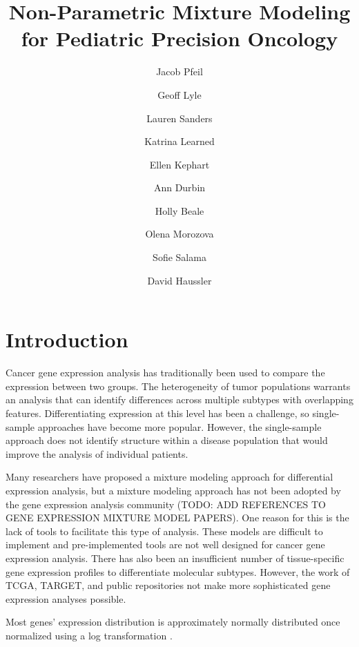 \documentclass[fleqn,10pt]{wlscirep}
\title{Non-Parametric Mixture Modeling for Pediatric Precision Oncology}
\author[1,*]{Jacob Pfeil}
\author[1]{Geoff Lyle}
\author[1]{Lauren Sanders}
\author[1]{Katrina Learned}
\author[1]{Ellen Kephart}
\author[1]{Ann Durbin}
\author[1]{Holly Beale}
\author[1]{Olena Morozova}
\author[1]{Sofie Salama}
\author[1]{David Haussler}
\affil[1]{University of California, Santa Cruz, Biomolecular Engineering, Santa Cruz, 95064, United States}
\affil[*]{jpfeil@ucsc.edu}
\begin{document}
\flushbottom
\maketitle
%
%
\thispagestyle{empty}


\section*{Introduction}

Cancer gene expression analysis has traditionally been used to compare the expression between two groups. The heterogeneity of tumor populations warrants an analysis that can identify differences across multiple subtypes with overlapping features. Differentiating expression at this level has been a challenge, so single-sample approaches have become more popular. However, the single-sample approach does not identify structure within a disease population that would improve the analysis of individual patients. 


Many researchers have proposed a mixture modeling approach for differential expression analysis, but a mixture modeling approach has not been adopted by the gene expression analysis community (TODO: ADD REFERENCES TO GENE EXPRESSION MIXTURE MODEL PAPERS). One reason for this is the lack of tools to facilitate this type of analysis. These models are difficult to implement and pre-implemented tools are not well designed for cancer gene expression analysis. There has also been an insufficient number of tissue-specific gene expression profiles to differentiate molecular subtypes. However, the work of TCGA, TARGET, and public repositories not make more sophisticated gene expression analyses possible. 

Most genes' expression distribution is approximately normally distributed once normalized using a log transformation \cite{zwiener2014transforming}. 

\end{document}
